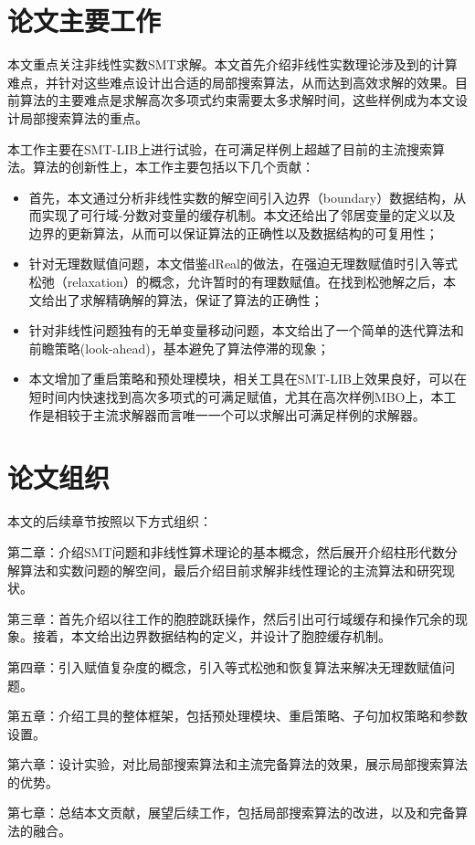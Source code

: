 \section{论文主要工作}
本文重点关注非线性实数SMT求解。本文首先介绍非线性实数理论涉及到的计算难点，并针对这些难点设计出合适的局部搜索算法，从而达到高效求解的效果。目前算法的主要难点是求解高次多项式约束需要太多求解时间，这些样例成为本文设计局部搜索算法的重点。

本工作主要在SMT-LIB\cite{BarFT-SMTLIB}上进行试验，在可满足样例上超越了目前的主流搜索算法。算法的创新性上，本工作主要包括以下几个贡献：
\begin{itemize}
    \item 首先，本文通过分析非线性实数的解空间引入边界（boundary）数据结构，从而实现了可行域-分数对变量的缓存机制。本文还给出了邻居变量的定义以及边界的更新算法，从而可以保证算法的正确性以及数据结构的可复用性；
    \item 针对无理数赋值问题，本文借鉴dReal的做法，在强迫无理数赋值时引入等式松弛（relaxation）的概念，允许暂时的有理数赋值。在找到松弛解之后，本文给出了求解精确解的算法，保证了算法的正确性；
    \item 针对非线性问题独有的无单变量移动问题，本文给出了一个简单的迭代算法和前瞻策略(look-ahead)，基本避免了算法停滞的现象；
    \item 本文增加了重启策略和预处理模块，相关工具在SMT-LIB上效果良好，可以在短时间内快速找到高次多项式的可满足赋值，尤其在高次样例MBO上，本工作是相较于主流求解器而言唯一一个可以求解出可满足样例的求解器。
\end{itemize}

\section{论文组织}
本文的后续章节按照以下方式组织：

第二章：介绍SMT问题和非线性算术理论的基本概念，然后展开介绍柱形代数分解算法和实数问题的解空间，最后介绍目前求解非线性理论的主流算法和研究现状。

第三章：首先介绍以往工作的胞腔跳跃操作，然后引出可行域缓存和操作冗余的现象。接着，本文给出边界数据结构的定义，并设计了胞腔缓存机制。

第四章：引入赋值复杂度的概念，引入等式松弛和恢复算法来解决无理数赋值问题。

第五章：介绍工具的整体框架，包括预处理模块、重启策略、子句加权策略和参数设置。

第六章：设计实验，对比局部搜索算法和主流完备算法的效果，展示局部搜索算法的优势。

第七章：总结本文贡献，展望后续工作，包括局部搜索算法的改进，以及和完备算法的融合。